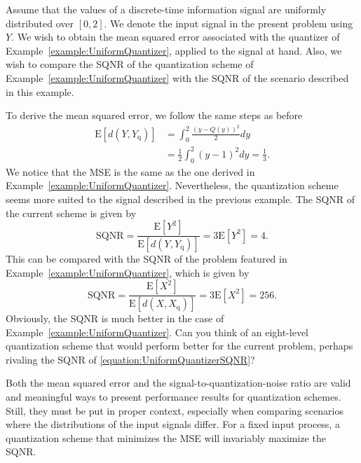 \begin{example}
Assume that the values of a discrete-time information signal are uniformly distributed over $[0,2]$.
We denote the input signal in the present problem using $Y$.
We wish to obtain the mean squared error associated with the quantizer of Example~\ref{example:UniformQuantizer}, applied to the signal at hand.
Also, we wish to compare the SQNR of the quantization scheme of Example~\ref{example:UniformQuantizer} with the SQNR of the scenario described in this example.

To derive the mean squared error, we follow the same steps as before
\begin{equation*}
\begin{split}
\mathrm{E} [ d(Y, Y_{\mathrm{q}}) ]
&= \int_0^{2} \frac{(y - Q(y))^2}{2} dy \\
&= \frac{1}{2} \int_{0}^{2} (y - 1)^2 dy = \frac{1}{3} .
\end{split}
\end{equation*}
We notice that the MSE is the same as the one derived in Example~\ref{example:UniformQuantizer}.
Nevertheless, the quantization scheme seems more suited to the signal described in the previous example.
The SQNR of the current scheme is given by
\begin{equation*}
\text{SQNR} = \frac{\mathrm{E}[Y^2]}{\mathrm{E} [ d(Y, Y_{\mathrm{q}}) ]}
= 3 \mathrm{E}[Y^2] = 4.
\end{equation*}
This can be compared with the SQNR of the problem featured in Example~\ref{example:UniformQuantizer}, which is given by
\begin{equation} \label{equation:UniformQuantizerSQNR}
\text{SQNR} = \frac{\mathrm{E}[X^2]}{\mathrm{E} [ d(X, X_{\mathrm{q}}) ]}
= 3 \mathrm{E}[X^2] = 256.
\end{equation}
Obviously, the SQNR is much better in the case of Example~\ref{example:UniformQuantizer}.
Can you think of an eight-level quantization scheme that would perform better for the current problem, perhaps rivaling the SQNR of \eqref{equation:UniformQuantizerSQNR}?
\end{example}

Both the mean squared error and the signal-to-quantization-noise ratio are valid and meaningful ways to present performance results for quantization schemes.
Still, they must be put in proper context, especially when comparing scenarios where the distributions of the input signals differ.
For a fixed input process, a quantization scheme that minimizes the MSE will invariably maximize the SQNR.


